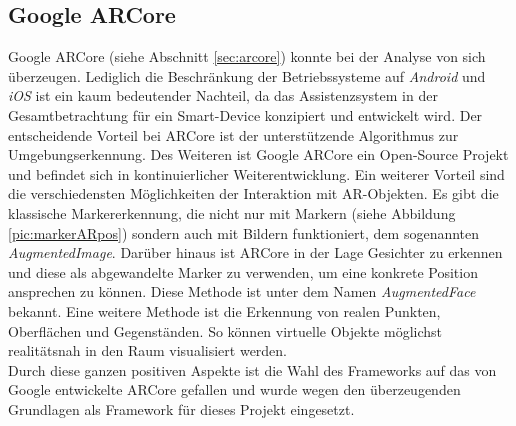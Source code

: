 \subsection{Google ARCore}
Google ARCore (siehe Abschnitt \ref{sec:arcore}) konnte bei der Analyse von sich überzeugen. Lediglich die Beschränkung der
Betriebssysteme auf \textit{Android} und \textit{iOS} ist ein kaum bedeutender Nachteil, da das Assistenzsystem in der Gesamtbetrachtung 
für ein Smart-Device konzipiert und entwickelt wird. Der entscheidende Vorteil bei 
ARCore ist der unterstützende Algorithmus zur Umgebungserkennung. Des Weiteren ist Google ARCore ein Open-Source Projekt und befindet sich 
in kontinuierlicher Weiterentwicklung. %
Ein weiterer Vorteil sind die verschiedensten Möglichkeiten der Interaktion mit \acs{AR}-Objekten. Es gibt die 
klassische Markererkennung, die nicht nur mit Markern (siehe Abbildung \ref{pic:markerARpos}) sondern auch mit Bildern funktioniert, dem sogenannten
\textit{AugmentedImage}. Darüber hinaus ist ARCore in der Lage Gesichter zu erkennen und diese als abgewandelte Marker zu verwenden, um eine konkrete 
Position ansprechen zu können. Diese Methode ist unter dem Namen \textit{AugmentedFace} bekannt. Eine weitere Methode ist die Erkennung von 
realen Punkten, Oberflächen und Gegenständen. So können virtuelle Objekte möglichst realitätsnah in den Raum visualisiert werden.
\\
\linebreak
Durch diese ganzen positiven Aspekte ist die Wahl des Frameworks auf das von Google entwickelte ARCore gefallen und wurde wegen den überzeugenden 
Grundlagen als Framework für dieses Projekt eingesetzt.

